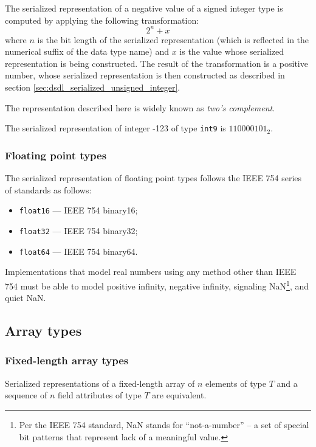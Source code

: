 The serialized representation of a negative value of a signed integer type is computed by
applying the following transformation:
$$2^n + x$$
where $n$ is the bit length of the serialized representation
(which is reflected in the numerical suffix of the data type name)
and $x$ is the value whose serialized representation is being constructed.
The result of the transformation is a positive number,
whose serialized representation is then constructed as described in section \ref{sec:dsdl_serialized_unsigned_integer}.

The representation described here is widely known as \emph{two's complement}.

\begin{remark}
    The serialized representation of integer -123 of type \verb|int9| is $110000101_2$.
\end{remark}

\subsubsection{Floating point types}

The serialized representation of floating point types follows the IEEE 754 series of standards as follows:

\begin{itemize}
    \item \verb|float16| --- IEEE 754 binary16;
    \item \verb|float32| --- IEEE 754 binary32;
    \item \verb|float64| --- IEEE 754 binary64.
\end{itemize}

Implementations that model real numbers using any method other than IEEE 754 must be able to model
positive infinity, negative infinity, signaling NaN\footnote{Per the IEEE 754 standard, NaN stands for
``not-a-number'' -- a set of special bit patterns that represent lack of a meaningful value.},
and quiet NaN.

\subsection{Array types}

\subsubsection{Fixed-length array types}

Serialized representations of a fixed-length array of $n$ elements of type $T$ and
a sequence of $n$ field attributes of type $T$ are equivalent.

